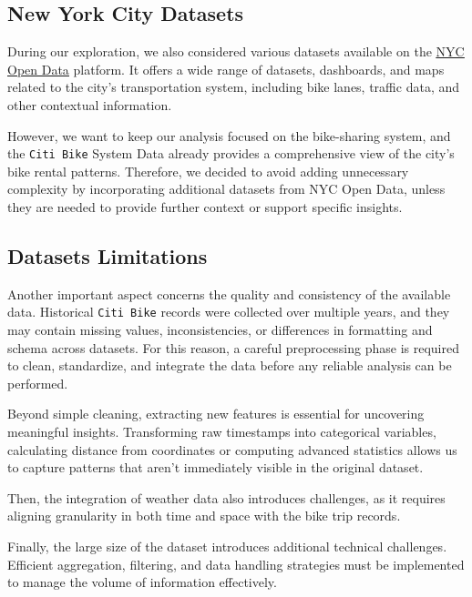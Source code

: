 \subsection{New York City Datasets}
During our exploration, we also considered various datasets available on the \href{https://opendata.cityofnewyork.us/}{\underline{NYC Open Data}} platform.
It offers a wide range of datasets, dashboards, and maps related to the city's transportation system, including bike lanes, traffic data, and other contextual information.

However, we want to keep our analysis focused on the bike-sharing system, and the \texttt{Citi Bike} System Data already provides a comprehensive view of the city's bike rental patterns.
Therefore, we decided to avoid adding unnecessary complexity by incorporating additional datasets from NYC Open Data, unless they are needed to provide further context or support specific insights.

\subsection{Datasets Limitations}

Another important aspect concerns the quality and consistency of the available data.
Historical \texttt{Citi Bike} records were collected over multiple years, and they may contain missing values, inconsistencies, or differences in formatting and schema across datasets.
For this reason, a careful preprocessing phase is required to clean, standardize, and integrate the data before any reliable analysis can be performed.

Beyond simple cleaning, extracting new features is essential for uncovering meaningful insights. 
Transforming raw timestamps into categorical variables, calculating distance from coordinates  or computing advanced statistics 
allows us to capture patterns that aren't immediately visible in the original dataset.

Then, the integration of weather data also introduces challenges, as it requires aligning granularity in both time and space with the bike trip records.

Finally, the large size of the dataset introduces additional technical challenges.
Efficient aggregation, filtering, and data handling strategies must be implemented to manage the volume of information effectively. 

